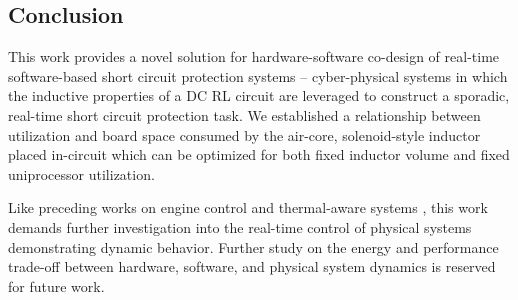 \clearpage \subsection{Conclusion} \label{subsec:conclusion}
This work provides a novel solution for hardware-software co-design of real-time software-based short circuit protection systems -- cyber-physical systems in which the inductive properties of a DC RL circuit are leveraged to construct a sporadic, real-time short circuit protection task.
We established a relationship between utilization and board space consumed by the air-core, solenoid-style inductor placed in-circuit which can be optimized for both fixed inductor volume and fixed uniprocessor utilization.

Like preceding works on engine control \cite{biondi_engine_2015} and thermal-aware systems \cite{hettiarachchi_design_2014}, this work demands further investigation into the real-time control of physical systems demonstrating dynamic behavior.
Further study on the energy and performance trade-off between hardware, software, and physical system dynamics is reserved for future work.









